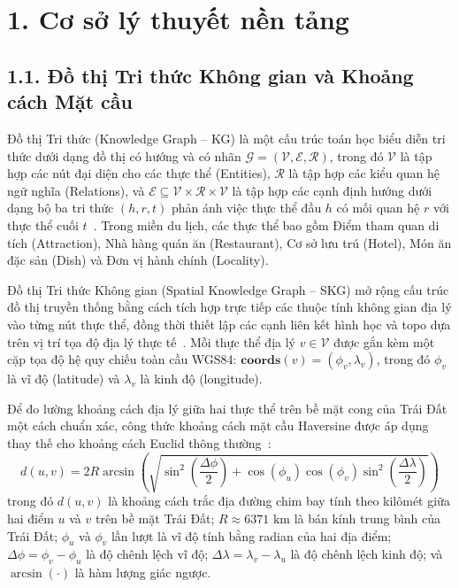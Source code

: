\label{phan:tong-quan}

\section*{1. Cơ sở lý thuyết nền tảng}
{}

\subsection*{1.1. Đồ thị Tri thức Không gian và Khoảng cách Mặt cầu}
{}

Đồ thị Tri thức (Knowledge Graph -- KG) là một cấu trúc toán học biểu diễn tri thức dưới dạng đồ thị có hướng và có nhãn $\mathcal{G} = (\mathcal{V}, \mathcal{E}, \mathcal{R})$, trong đó $\mathcal{V}$ là tập hợp các nút đại diện cho các thực thể (Entities), $\mathcal{R}$ là tập hợp các kiểu quan hệ ngữ nghĩa (Relations), và $\mathcal{E} \subseteq \mathcal{V} \times \mathcal{R} \times \mathcal{V}$ là tập hợp các cạnh định hướng dưới dạng bộ ba tri thức $(h, r, t)$ phản ánh việc thực thể đầu $h$ có mối quan hệ $r$ với thực thể cuối $t$~\cite{hogan2021kg}. Trong miền du lịch, các thực thể bao gồm Điểm tham quan di tích (Attraction), Nhà hàng quán ăn (Restaurant), Cơ sở lưu trú (Hotel), Món ăn đặc sản (Dish) và Đơn vị hành chính (Locality).

Đồ thị Tri thức Không gian (Spatial Knowledge Graph -- SKG) mở rộng cấu trúc đồ thị truyền thống bằng cách tích hợp trực tiếp các thuộc tính không gian địa lý vào từng nút thực thể, đồng thời thiết lập các cạnh liên kết hình học và topo dựa trên vị trí tọa độ địa lý thực tế~\cite{ballatore2014spatial}. Mỗi thực thể địa lý $v \in \mathcal{V}$ được gắn kèm một cặp tọa độ hệ quy chiếu toàn cầu WGS84: $\mathbf{coords}(v) = (\phi_v, \lambda_v)$, trong đó $\phi_v$ là vĩ độ (latitude) và $\lambda_v$ là kinh độ (longitude).

Để đo lường khoảng cách địa lý giữa hai thực thể trên bề mặt cong của Trái Đất một cách chuẩn xác, công thức khoảng cách mặt cầu Haversine được áp dụng thay thế cho khoảng cách Euclid thông thường~\cite{sinnott1984haversine}:
\begin{equation}
    d(u, v) = 2 R \arcsin \left( \sqrt{\sin^2\left(\frac{\Delta\phi}{2}\right) + \cos(\phi_u) \cos(\phi_v) \sin^2\left(\frac{\Delta\lambda}{2}\right)} \right)
    \label{eq:haversine}
\end{equation}
trong đó $d(u, v)$ là khoảng cách trắc địa đường chim bay tính theo kilômét giữa hai điểm $u$ và $v$ trên bề mặt Trái Đất; $R \approx 6371\text{ km}$ là bán kính trung bình của Trái Đất; $\phi_u$ và $\phi_v$ lần lượt là vĩ độ tính bằng radian của hai địa điểm; $\Delta\phi = \phi_v - \phi_u$ là độ chênh lệch vĩ độ; $\Delta\lambda = \lambda_v - \lambda_u$ là độ chênh lệch kinh độ; và $\arcsin(\cdot)$ là hàm lượng giác ngược.

